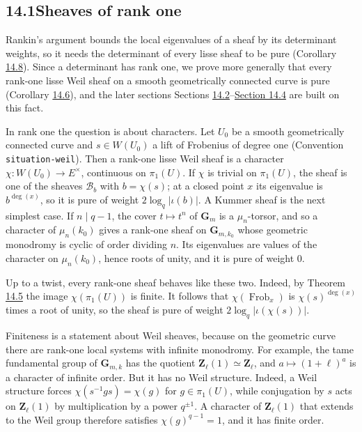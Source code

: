 \documentclass[11pt]{article}
\newcommand{\bpslug}[1]{\texttt{#1}}
\begin{document}
\subsection*{\texorpdfstring{14.1\quad Sheaves of rank one}{14.1 Sheaves of rank one}}
\label{bp3}%
\label{bp4}%
Rankin's argument bounds the local eigenvalues of a sheaf by its determinant weights, so it needs the determinant of every lisse sheaf to be pure (Corollary \hyperref[bp27]{14.8}). Since a determinant has rank one, we prove more generally that every rank-one lisse Weil sheaf on a smooth geometrically connected curve is pure (Corollary \hyperref[bp23]{14.6}), and the later sections Sections \hyperref[bp31]{14.2}–\hyperref[bp80]{Section 14.4} are built on this fact.

In rank one the question is about characters. Let \(U_0\) be a smooth geometrically connected curve and \(s\in W(U_0)\) a lift of Frobenius of degree one (Convention \bpslug{situation-{}\allowbreak{}weil}). Then a rank-one lisse Weil sheaf is a character \(\chi:W(U_0)\to E^\times\), continuous on \(\pi_1(U)\). If \(\chi\) is trivial on \(\pi_1(U)\), the sheaf is one of the sheaves \(\mathcal B_b\) with \(b=\chi(s)\); at a closed point \(x\) its eigenvalue is \(b^{\deg(x)}\), so it is pure of weight \(2\log_q|\iota(b)|\). A Kummer sheaf is the next simplest case. If \(n\mid q-1\), the cover \(t\mapsto t^n\) of \(\mathbf G_m\) is a \(\mu_n\)-torsor, and so a character of \(\mu_n(k_0)\) gives a rank-one sheaf on \(\mathbf G_{m,k_0}\) whose geometric monodromy is cyclic of order dividing \(n\). Its eigenvalues are values of the character on \(\mu_n(k_0)\), hence roots of unity, and it is pure of weight \(0\).

Up to a twist, every rank-one sheaf behaves like these two. Indeed, by Theorem \hyperref[bp20]{14.5} the image \(\chi(\pi_1(U))\) is finite. It follows that \(\chi(\operatorname{Frob}_x)\) is \(\chi(s)^{\deg(x)}\) times a root of unity, so the sheaf is pure of weight \(2\log_q|\iota(\chi(s))|\).

Finiteness is a statement about Weil sheaves, because on the geometric curve there are rank-one local systems with infinite monodromy. For example, the tame fundamental group of \(\mathbf G_{m,k}\) has the quotient \(\mathbf Z_\ell(1)\simeq\mathbf Z_\ell\), and \(a\mapsto(1+\ell)^a\) is a character of infinite order. But it has no Weil structure. Indeed, a Weil structure forces \(\chi(s^{-1}gs)=\chi(g)\) for \(g\in\pi_1(U)\), while conjugation by \(s\) acts on \(\mathbf Z_\ell(1)\) by multiplication by a power \(q^{\pm1}\). A character of \(\mathbf Z_\ell(1)\) that extends to the Weil group therefore satisfies \(\chi(g)^{q-1}=1\), and it has finite order.
\end{document}
